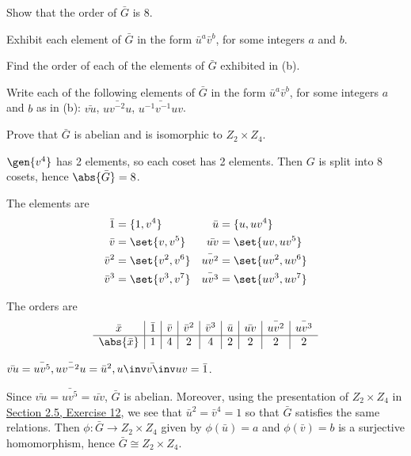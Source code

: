 \begin{problems}
    \begin{problems}
        \item Show that the order of $\bar{G}$ is $8$.
        \item Exhibit each element of $\bar{G}$ in the form $\bar{u}^a \bar{v}^b$, for some integers $a$ and $b$.
        \item Find the order of each of the elements of $\bar{G}$ exhibited in (b).
        \item Write each of the following elements of $\bar{G}$ in the form $\bar{u}^a \bar{v}^b$, for some integers $a$ and $b$ as in (b): $\bar{vu}$, $\bar{uv^{-2}u}$, $\bar{u^{-1}v^{-1}uv}$.
        \item Prove that $\bar{G}$ is abelian and is isomorphic to $Z_2 \times Z_4$.
    \end{problems}
    \begin{solalph}
        \item $\gen{v^4}$ has 2 elements, so each coset has 2 elements. Then $G$ is split into 8 cosets, hence $\abs{\bar G} = 8$.
        \item The elements are
        \begin{align*}
            \bar 1 & = \{1, v^4\} & \bar u & = \{u, uv^4\} \\
            \bar v & = \set{v, v^5} & \bar{uv} & = \set{uv, uv^5} \\
            \bar v^2 & = \set{v^2, v^6} & \bar{uv^2} & = \set{uv^2, uv^6} \\
            \bar v^3 & = \set{v^3, v^7} & \bar{uv^3} & = \set{uv^3, uv^7}
        \end{align*}
        \item The orders are
        \[
        \begin{array}{c|c|c|c|c|c|c|c|c}
            \bar x & \bar 1 & \bar v & \bar v^2 & \bar v^3 & \bar u & \bar{uv} & \bar{uv^2} & \bar{uv^3} \\
            \hline
            \abs{\bar x} & 1 & 4 & 2 & 4 & 2 & 2 & 2 & 2
        \end{array}
        \]
        \item $\bar{vu} = \bar{uv^5}, \bar{uv^{-2}u} = \bar u^2, \bar{u\inv v\inv uv} = \bar 1$.
        \item Since $\bar{vu} = \bar{uv^5} = \bar{uv}$, $\bar G$ is abelian. Moreover, using the presentation of $Z_2 \times Z_4$ in \hyperref[ex2.5.12]{Section 2.5, Exercise 12}, we see that $\bar u^2 = \bar v^4 = 1$ so that $\bar G$ satisfies the same relations. Then $\phi : \bar G \to Z_2 \times Z_4$ given by $\phi(\bar u) = a$ and $\phi(\bar v) = b$ is a surjective homomorphism, hence $\bar G \cong Z_2 \times Z_4$.

\end{solalph}
\end{problems}
